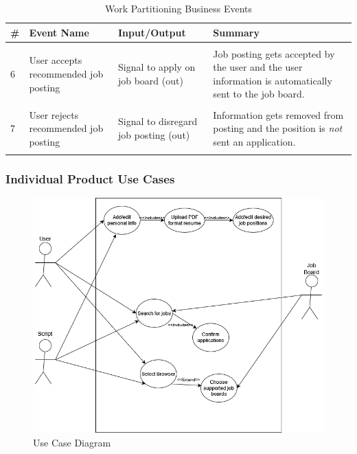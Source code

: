 \documentclass[12pt, titlepage]{article}
\begin{document}
\begin{table}[ht]
\centering
    \begin{tabular}{|P{0.2in}|P{1.1in}|P{1.8in}|P{2.2in}|}
    \hline
    \textbf{\#} & \textbf{Event Name} & \textbf{Input/Output} & \textbf{Summary}\\ 
    
    \hline
    
    & & & \\
    
    6
    & User accepts recommended job posting 
    & Signal to apply on job board (out)
    & Job posting gets accepted by the user and the user information is automatically sent to the job board. \\
    
    & & & \\
    
    7
    & User rejects recommended job posting 
    &  Signal to disregard job posting (out)
    & Information gets removed from posting and the position is \textit{not} sent an application. \\
    
    & & & \\
    
    \hline
    \end{tabular}
    \caption{Work Partitioning Business Events}
\end{table}

\FloatBarrier

\subsubsection{Individual Product Use Cases}
\begin{figure}[ht]
    \centering
    \includegraphics[width=125mm,scale=0.5]{SRS_Diagrams/3XA3useCase0.drawio.png}
    \caption{Use Case Diagram}
    \label{fig:usecase}
\end{figure}
\end{document}
